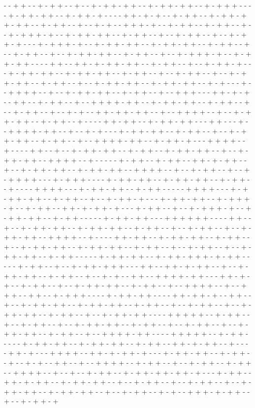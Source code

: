 - - + + - - + - + + - - + - - + - + + - + + - - + - + + - + + - - + - + + + - - - - + - + + - + + - - + - + + - + - - - - + + - + - + - - + - + + - - + - + + - + + - + + - - + - + + - - + - - + - + - - + + + - + - - + - + + - - + - + + - - + - - + - + + + - + - - + - + + - + + - - + - + + - - + - - + - + + - - + - - + - + + - + - - - + - + + + - + - - + - + + - + + - - + - + + - + + - - + - + + - - + - - + - + + - - + - - + - + + - + + - - + - + + - - + - - + - + + + - + - - + - + + - + + - - - - + + - - + + - + - + + - + + - - + - + + - - + - - + - + + - + - - - + - + + - + + - - + - + + - + + - - + - + + - - + - - + - + + - - + - - + - + + - + + - - + - + + - - + - - + - + + - + + - - + - + + - + + - - + - + - - - + - - + + + + - - + - - + - + + - + + - - + - + + - - + - - + + + - - - + + - + - + - - + + - - + - + + - - + - - + + + + - + + - - + - + + - + + - - + - + + - - + - - + - + + - - + - - + - + - - + + - + + - + + - - + - - + + + + - - + - - + - + + - + + - - + - + + - - + - - - - + + - + + - - + - + + - + + - - - + + - - - + - - + + + + - + + - - + - - + - + - - - + - + + - + + - - + - + + - - + - - + - + + - + + - - + - + + - - + - - + + + + - + + - - + - + + - + - - - + + + + - - + - - - - + + - - + - - + - + + - + + - - + - + + - - + - + + - + + - - + - - + - + + - + + - - + + + + - - + - - - - - + - + + - - + - + + - - + + - + - + + - - + - - + - + + - + + - - + - + + - + + - - + + + + - - + - - + - + + - - + - - + - + + + + - - - + - + + + - - - - + - + + - + + - - + - + + - + + - - + - + + - - + - - - - + + + + - - - + - + + - + + - - + - + + - - - - - + + + + - - - + - + - + + - + + - - + - + + - - + - - + - + + - + - - - + - + + - + + - - + - + + + - + - - + - + + - - + + - + - + + - + - - - + - + + - - + - - + - + + + - + - - + - + + - + + - - + - + + - - - - - + - + + - + + - - - + + + + + + - - - - + + - - + - - + - + + - + + - - + - + + - + + - - + - + + - - + - - + - + + - - + - - + - + + - + + - - + + + + - - + - - - - + + - + + - - + - + + - + + - - + - + + - - + - - + - + + - + + - - + - + + - + + - - + - + + - - + - - + - + + - - + - - + - + + - + + - - + - + + - - - - - + - + + - + + - - + - + + - + + + - + - + + - - - - - + - + + - - + - - + - + + - + + + - - - + + - - + + - + - + + - - + - - + - + + - + + - - + - + + - - + - - + - + - - + + - - + + + + - + + - - - + + - + - + - - + - + + - - + - - + - + + - + + - - + - + + - - + - - + + + + - - + - - + + + - - + + - - + - + + + - - - - + - + + - + + - - - - + + - + + - + - - + + - - + - - + - + + - + + - - + - + + - + + - - + - + + - - + - - + - + + - - + - - + - + + - + + - - + - + + - - + - - + - + + - + + - - - - + + + + + - - + - + + - - + - - + - + + - - + - - + - + + - + + - - + - + + - - + - - + - + + - - + - - + - + + - + + - - + - + + - - + - - + + + + - + + - - - - + + + + + - - + - + + - - - - - + - + + - + + - - + - + + - + + - - + - + + - - + + - + - + + - - + - - - - + + - + - - - + + + + - - + + - + - + + - + - - - + - + + - + + - - + - + + - - + - - + - + - - + + - - + - - + + + + - - + - + + - - + - - + - + + - - + - + + - - + + + + - - + - - + - - + - + + - - + - + + - + + - + + - + - - - + - + + - - + + - + - + + - - + - + + - + + - - + - - + - + + - - + - - + - + + - - + - - + - + + - + + - - + - + + - + + - - + - - + - + + - - + - + - - + + + - + - + + - - + - - + - + + - + 